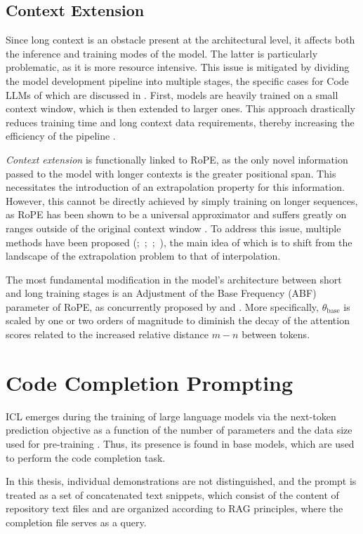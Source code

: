 \subsection{Context Extension}

Since long context is an obstacle present at the architectural level, it affects both the inference and training modes of the model. The latter is particularly problematic, as it is more resource intensive. This issue is mitigated by dividing the model development pipeline into multiple stages, the specific cases for Code LLMs of which are discussed in . First, models are heavily trained on a small context window, which is then extended to larger ones. This approach drastically reduces training time and long context data requirements, thereby increasing the efficiency of the pipeline \parencite{xiong2023}.

\textit{Context extension} is functionally linked to RoPE, as the only novel information passed to the model with longer contexts is the greater positional span. This necessitates the introduction of an extrapolation property for this information. However, this cannot be directly achieved by simply training on longer sequences, as RoPE has been shown to be a universal approximator and suffers greatly on ranges outside of the original context window \mbox{\parencite{chen2023}}. To address this issue, multiple methods have been proposed (\cite{chen2023};~\cite{rozière2023};~\cite{peng2023};~\cite{xiong2023}), the main idea of which is to shift from the landscape of the extrapolation problem to that of interpolation.

The most fundamental modification in the model's architecture between short and long training stages is an Adjustment of the Base Frequency (ABF) parameter of RoPE, as concurrently proposed by \citet{rozière2023} and \citet{xiong2023}. More specifically, \(\theta_{\mathrm{base}}\) is scaled by one or two orders of magnitude to diminish the decay of the attention scores related to the increased relative distance \(m - n\) between tokens.

\section{Code Completion Prompting}

ICL emerges during the training of large language models via the next-token prediction objective as a function of the number of parameters and the data size used for pre-training \parencite{hahn2023}. Thus, its presence is found in base models, which are used to perform the code completion task.

In this thesis, individual demonstrations are not distinguished, and the prompt is treated as a set of concatenated text snippets, which consist of the content of repository text files and are organized according to RAG principles, where the completion file serves as a query.
